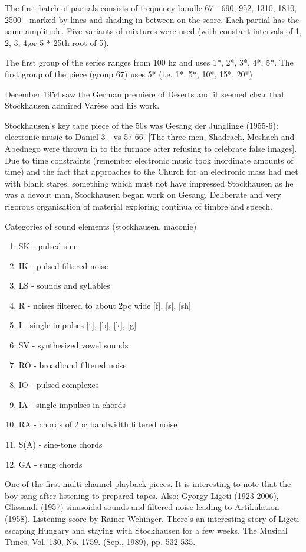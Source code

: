 The first batch of partials consists of frequency bundle 67 - 690, 952, 1310, 1810, 2500 - marked by lines and shading in between on the score. Each partial has the same amplitude. Five variants of mixtures were used (with constant intervals of 1, 2, 3, 4,or 5 *
25th root of 5).

The first group of the series ranges from 100 hz and uses 1*, 2*, 3*, 4*, 5*. The first group of the piece (group 67) uses 5* (i.e. 1*, 5*, 10*, 15*, 20*) 

December 1954 saw the German premiere of D\'eserts and it seemed clear that Stockhausen admired Varèse and his work.

Stockhausen’s key tape piece of the 50s was Gesang der Junglinge (1955-6): electronic music to Daniel 3 - vs 57-66. [The three men, Shadrach, Meshach and Abednego were thrown in to the furnace after refusing to celebrate false images]. Due to time constraints
(remember electronic music took inordinate amounts of time) and the fact that approaches to the Church for an electronic mass had met with blank stares, something which must not have impressed Stockhausen as he was a devout man, Stockhausen began work on Gesang.
Deliberate and very rigorous organisation of material exploring continua of timbre and speech.

Categories of sound elements (stockhausen, maconie)
\begin{enumerate}
\item SK - pulsed sine
\item IK - pulsed filtered noise
\item LS - sounds and syllables
\item R - noises filtered to about 2pc wide [f], [s], [sh]
\item I - single impulses [t], [b], [k], [g]
\item SV - synthesized vowel sounds
\item RO - broadband filtered noise
\item IO - pulsed complexes
\item IA - single impulses in chords
\item RA - chords of 2pc bandwidth filtered noise
\item S(A) - sine-tone chords
\item GA - sung chords
\end{enumerate}

One of the first multi-channel playback pieces. It is interesting to note that the boy sang after listening to prepared tapes.
Also: Gyorgy Ligeti (1923-2006), Glissandi (1957) sinusoidal sounds and filtered noise leading to Artikulation (1958). Listening score by Rainer Wehinger. There's an interesting story of Ligeti escaping Hungary and staying with Stockhausen for a few
weeks. The Musical Times, Vol. 130, No. 1759. (Sep., 1989), pp. 532-535.

